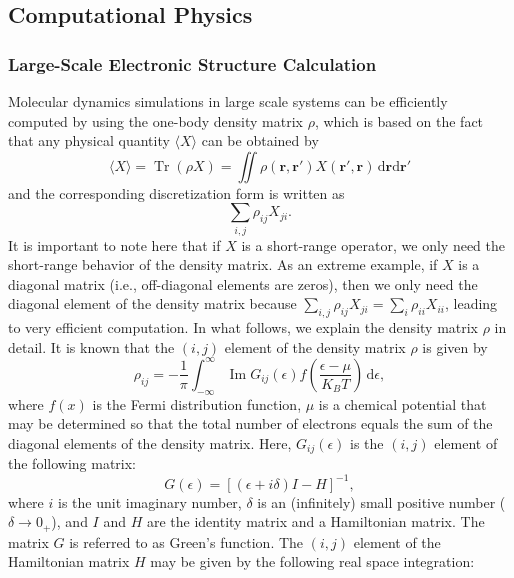 \subsection{{Computational Physics}}\label{sec:computational-physics}
\subsubsection{{Large-Scale Electronic Structure Calculation}}\label{subsec:electronic-structure}
{Molecular dynamics simulations in large scale systems can be efficiently computed by using the one-body density matrix $\rho$, which is based on the fact that any physical quantity $\langle X\rangle$ can be obtained by}
\[\langle X\rangle=\operatorname{Tr}(\rho X)=\iint\rho(\boldsymbol{r},\boldsymbol{r}')X(\boldsymbol{r}',\boldsymbol{r})\,\mathrm d\boldsymbol{r}\mathrm d\boldsymbol{r}'\]
{and the corresponding discretization form is written as}
\[\sum_{i,j}\rho_{ij}X_{ji}.\]
{It is important to note here that if $X$ is a short-range operator, we only need the short-range behavior of the density matrix. As an extreme example, if $X$ is a diagonal matrix (i.e., off-diagonal elements are zeros), then we only need the diagonal element of the density matrix because $\sum_{i,j}\rho_{ij}X_{ji}=\sum_i\rho_{ii}X_{ii}$, leading to very efficient computation.}
{In what follows, we explain the density matrix $\rho$ in detail. It is known that the $(i,j)$ element of the density matrix $\rho$ is given by}
\begin{equation}\label{eq:density-matrix-green-integral}
\rho_{ij}=-\frac1\pi\int_{-\infty}^{\infty}\operatorname{Im}G_{ij}(\epsilon)f\left(\frac{\epsilon-\mu}{K_BT}\right)\,\mathrm d\epsilon,
\end{equation}
{where $f(x)$ is the Fermi distribution function, $\mu$ is a chemical potential that may be determined so that the total number of electrons equals the sum of the diagonal elements of the density matrix. Here, $G_{ij}(\epsilon)$ is the $(i,j)$ element of the following matrix:}
\begin{equation}\label{eq:green-function-resolvent}
G(\epsilon)=[(\epsilon+i\delta)I-H]^{-1},
\end{equation}
{where $i$ is the unit imaginary number, $\delta$ is an (infinitely) small positive number ($\delta\to0_+$), and $I$ and $H$ are the identity matrix and a Hamiltonian matrix. The matrix $G$ is referred to as Green's function. The $(i,j)$ element of the Hamiltonian matrix $H$ may be given by the following real space integration:}
